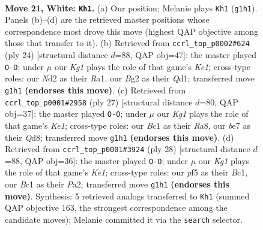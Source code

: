 \documentclass[11pt]{article}
\begin{document}
\begin{figure}[p]
\label{fig:thought-m38}
\end{figure}

\clearpage

\begin{figure}[p]\centering
\begin{subfigure}{0.46\textwidth}\centering
\resizebox{\linewidth}{!}{%
\newchessgame
\chessboard[
  setfen={1rbq1r1k/p1n1b2p/6p1/2pp1p1n/P4P2/1P3NP1/Q2NP1BP/R1B1R1K1 w - - 0 21},
  showmover=false,
  pgfstyle=straightmove, color=movearrow, markmove={g1-h1}
]}
\caption{}
\end{subfigure}\hfill
\begin{subfigure}{0.46\textwidth}\centering
\resizebox{\linewidth}{!}{%
\newchessgame
\chessboard[
  setfen={r1bq1r1k/ppp3p1/2nbpn1p/5p2/2BP4/P3PN2/NP1B1PPP/R2QK2R w KQ - 1 13},
  showmover=false,
  pgfstyle=straightmove, color=movearrow, markmove={e1-g1}
]}
\caption{}
\end{subfigure}
\\[4pt]
\begin{subfigure}{0.46\textwidth}\centering
\resizebox{\linewidth}{!}{%
\newchessgame
\chessboard[
  setfen={r2qk2r/1p1nbp2/3p1np1/p2Pp2p/2P5/1N2BP2/PP2B1PP/R2Q1R1K b kq - 1 14},
  showmover=false,
  pgfstyle=straightmove, color=movearrow, markmove={e8-g8}
]}
\caption{}
\end{subfigure}\hfill
\begin{subfigure}{0.46\textwidth}\centering
\resizebox{\linewidth}{!}{%
\newchessgame
\chessboard[
  setfen={r1bq1rk1/ppp3b1/3p1n1p/3P1p2/2P2Pp1/2NQ4/PP2N1PP/R1B1K2R w KQ - 4 15},
  showmover=false,
  pgfstyle=straightmove, color=movearrow, markmove={e1-g1}
]}
\caption{}
\end{subfigure}
\caption{\textbf{Move 21, White: \texttt{Kh1}.} (a) Our position; Melanie plays \texttt{Kh1} (\texttt{g1h1}). Panels (b)--(d) are the retrieved master positions whose correspondence most drove this move (highest QAP objective among those that transfer to it). (b) Retrieved from \texttt{ccrl\_top\_p0002\#624} (ply 24) [structural distance $d$=88, QAP obj=47]: the master played \texttt{O-O}; under $\mu$ our \emph{Kg1} plays the role of that game's \emph{Ke1}; cross-type roles: our \emph{N}d2 as their \emph{R}a1, our \emph{B}g2 as their \emph{Q}d1; transferred move \texttt{g1h1} \textbf{(endorses this move)}. (c) Retrieved from \texttt{ccrl\_top\_p0001\#2958} (ply 27) [structural distance $d$=80, QAP obj=37]: the master played \texttt{O-O}; under $\mu$ our \emph{Kg1} plays the role of that game's \emph{Ke1}; cross-type roles: our \emph{B}c1 as their \emph{R}a8, our \emph{b}e7 as their \emph{Q}d8; transferred move \texttt{g1h1} \textbf{(endorses this move)}. (d) Retrieved from \texttt{ccrl\_top\_p0001\#3924} (ply 28) [structural distance $d$=88, QAP obj=36]: the master played \texttt{O-O}; under $\mu$ our \emph{Kg1} plays the role of that game's \emph{Ke1}; cross-type roles: our \emph{p}f5 as their \emph{B}c1, our \emph{B}c1 as their \emph{P}a2; transferred move \texttt{g1h1} \textbf{(endorses this move)}. Synthesis: 5 retrieved analogs transferred to \texttt{Kh1} (summed QAP objective 163, the strongest correspondence among the candidate moves); Melanie committed it via the \texttt{search} selector.}

\end{figure}
\end{document}
